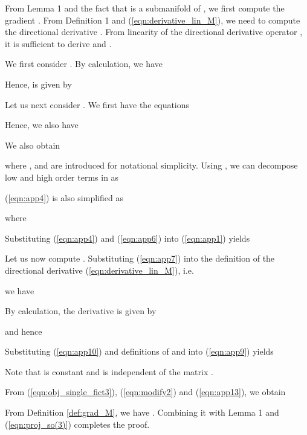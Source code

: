 \documentclass[conference,letterpaper]{ieeeconf}
\begin{document}
From Lemma 1 and the fact that 
is a submanifold of ,
we first compute the gradient .
From Definition 1 and (\ref{eqn:derivative_lin_M}),
we need to compute the directional derivative
.
From linearity of the directional derivative operator ,
it is sufficient to derive 
 and .



We first consider .
By calculation, we have

Hence, 
is given by





Let us next consider  
. We first have the equations

Hence, we also have

We also obtain

where , 
 and 
are introduced for notational simplicity.
Using ,
we can decompose low and high order terms in 
as

(\ref{eqn:app4}) is also simplified as

where

Substituting (\ref{eqn:app4}) and (\ref{eqn:app6}) 
into (\ref{eqn:app1}) yields




Let us now compute .
Substituting (\ref{eqn:app7}) into the definition of the directional derivative (\ref{eqn:derivative_lin_M}),
i.e.

we have

By calculation, the derivative  is given by

and hence

Substituting (\ref{eqn:app10}) and definitions of  and 
into (\ref{eqn:app9})
yields

Note that  is constant and 
 is independent of the matrix .



From (\ref{eqn:obj_single_fict3}), (\ref{eqn:modify2}) and (\ref{eqn:app13}),
we obtain

From Definition \ref{def:grad_M},
we have
.
Combining it with Lemma 1 and
(\ref{eqn:proj_so(3)}) completes the proof.
\end{document}
